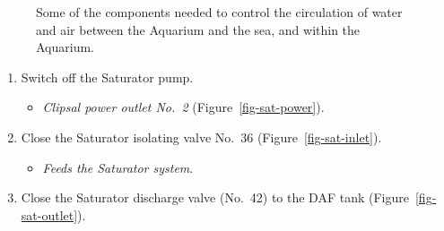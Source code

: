 \documentclass[
  letterpaper,
  DIV=11,
  numbers=noendperiod]{scrreprt}
\providecommand{\tightlist}{%
  \setlength{\itemsep}{0pt}\setlength{\parskip}{0pt}}\usepackage{longtable,booktabs,array}
\begin{document}
\begin{figure}[H]

\begin{minipage}[t]{0.33\linewidth}

{\centering 


}

\end{minipage}%
%
\begin{minipage}[t]{0.33\linewidth}

{\centering 


}

\end{minipage}%
%
\begin{minipage}[t]{0.33\linewidth}

{\centering 


}

\end{minipage}%

\caption{\label{fig-seacirc}Some of the components needed to control the
circulation of water and air between the Aquarium and the sea, and
within the Aquarium.}

\end{figure}

\begin{enumerate}
\def\labelenumi{\arabic{enumi}.}
\setcounter{enumi}{3}
\tightlist
\item
  Switch off the Saturator pump.

  \begin{itemize}
  \tightlist
  \item
    \emph{Clipsal power outlet No.~2} (Figure~\ref{fig-sat-power}).
  \end{itemize}
\item
  Close the Saturator isolating valve No.~36
  (Figure~\ref{fig-sat-inlet}).

  \begin{itemize}
  \tightlist
  \item
    \emph{Feeds the Saturator system}.
  \end{itemize}
\item
  Close the Saturator discharge valve (No.~42) to the DAF tank
  (Figure~\ref{fig-sat-outlet}).
\end{enumerate}
\end{document}
